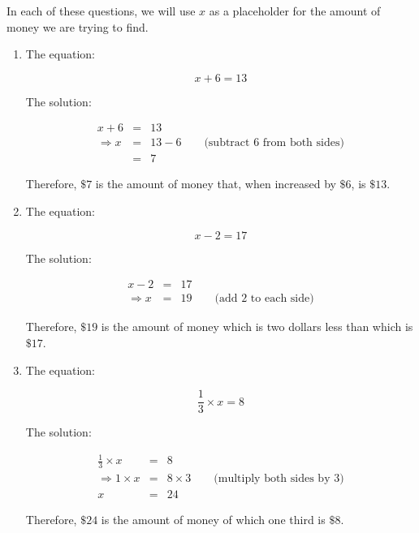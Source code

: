 
In each of these questions, we will use $x$ as a placeholder for the amount of
money we are trying to find.

\begin{enumerate}
    \item The equation:

        \[ x + 6 = 13 \]

        The solution:

        \begin{eqnarray*}
                    x + 6 &=& 13\\
            \Rightarrow x &=& 13 - 6\qquad\mbox{(subtract 6 from both sides)}\\
                          &=& 7
        \end{eqnarray*}

        Therefore, $\mbox{\$}7$ is the amount of money that, when increased by
        $\mbox{\$}6$, is $\mbox{\$13}$.

    \item The equation:

        \[ x - 2 = 17 \]

        The solution:

        \begin{eqnarray*}
                    x - 2 &=& 17\\
            \Rightarrow x &=& 19\qquad\mbox{(add 2 to each side)}
        \end{eqnarray*}

        Therefore, $\mbox{\$19}$ is the amount of money which is two dollars
        less than which is $\mbox{\$}17$.

    \item The equation:

        \[ \frac{1}{3}\times x = 8 \]

        The solution:

        \begin{eqnarray*}
              \frac{1}{3}\times x &=& 8\\
            \Rightarrow 1\times x &=& 8\times3\qquad\mbox{(multiply both sides by 3)}\\
                                x &=& 24
        \end{eqnarray*}

        Therefore, $\mbox{\$}24$ is the amount of money of which one third is
        $\mbox{\$}8$.
\end{enumerate}

